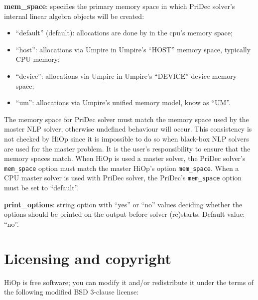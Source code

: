 \noindent \textbf{mem\_space}: specifies the primary memory space in which PriDec solver's internal linear algebra objects will be created:
\begin{itemize}
\item ``default'' (default): allocations are done by \Hi in the cpu's memory space;
\item ``host'':  allocations via Umpire in Umpire's ``HOST'' memory space, typically CPU memory;
\item ``device'': allocations via Umpire in Umpire's ``DEVICE'' device memory space;
\item ``um'': allocations via Umpire's unified memory model, know as ``UM''.
\end{itemize}
\warningcp{} The memory space for PriDec solver must match the memory space used by the master NLP solver, otherwise undefined behaviour will occur. This consistency is not checked by HiOp since it is impossible to do so when black-box NLP solvers are used for the master problem. It is the user's responsibility to ensure that the memory spaces match. When HiOp is used a master solver, the PriDec solver's \texttt{mem\_space} option must match the master HiOp's option \texttt{mem\_space}. When a CPU master solver is used with PriDec solver, the PriDec's \texttt{mem\_space} option must be set to ``default''.


\medskip

\noindent \textbf{print\_options}: string option with ``yes'' or ``no'' values deciding whether the options should be printed on the output before solver (re)starts. Default value: ``no''.

%

\section{Licensing and copyright}
HiOp is free software; you can modify it and/or redistribute it under the terms of the following  modified BSD 3-clause license:

